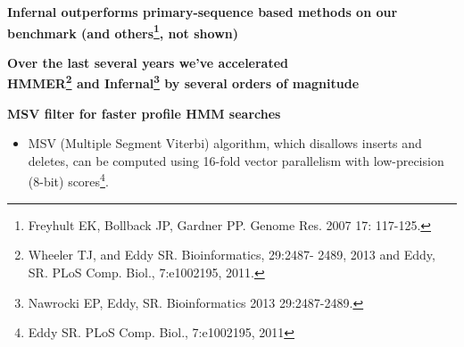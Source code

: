 \documentclass[landscape]{slides}
\begin{document}
\begin{slide}
\begin{center}

\textbf{Infernal outperforms primary-sequence based methods on our
  benchmark (and others\footnote{Freyhult EK, Bollback JP, Gardner
    PP. Genome Res. 2007 17: 117-125.}, not shown)}

\end{center}
\medskip


\vfill 
\end{slide}
\begin{slide}
\begin{center}

\textbf{Over the last several years we've accelerated
  \\ HMMER\footnote{Wheeler TJ, and Eddy SR. Bioinformatics, 29:2487-
    2489, 2013 and Eddy, SR. PLoS Comp. Biol., 7:e1002195, 2011.} and
  Infernal\footnote{Nawrocki EP, Eddy,
    SR. Bioinformatics 2013 29:2487-2489.} by several orders of magnitude}
\end{center}
\medskip


\vfill 
\end{slide}
\begin{slide}
\begin{center}
\textbf{MSV filter for faster profile HMM searches}
\end{center}

\medskip

\begin{itemize}

\small
\item MSV (Multiple Segment Viterbi) algorithm, which disallows inserts
  and deletes, can be computed using 16-fold vector parallelism with
  low-precision (8-bit) scores\footnote{Eddy SR. PLoS Comp. Biol., 7:e1002195, 2011}.

\end{itemize}


\vfill 
\end{slide}
\end{document}
